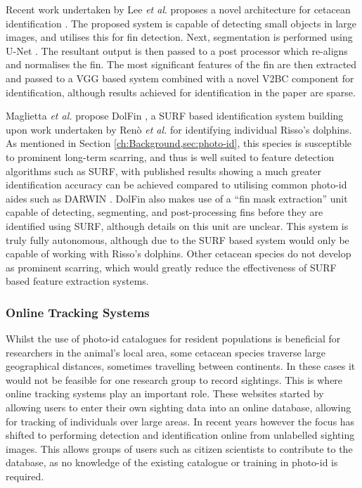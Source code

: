 Recent work undertaken by Lee \textit{et al}. proposes a novel architecture for cetacean identification \cite{lee_backbone_2020}. The proposed system is capable of detecting small objects in large images, and utilises this for fin detection. Next, segmentation is performed using U-Net \cite{ronneberger_u-net_2015}. The resultant output is then passed to a post processor which re-aligns and normalises the fin. The most significant features of the fin are then extracted and passed to a VGG based system \cite{simonyan_very_2015} combined with a novel V2BC component for identification, although results achieved for identification in the paper are sparse.

Maglietta \textit{et al.} propose DolFin \cite{maglietta_dolfin_2018}, a SURF based identification system \cite{bay_speeded-up_2008} building upon work undertaken by Renò \textit{et al.} \cite{reno_sift-based_2019} for identifying individual Risso's dolphins. As mentioned in Section \ref{ch:Background,sec:photo-id}, this species is susceptible to prominent long-term scarring, and thus is well suited to feature detection algorithms such as SURF, with published results showing a much greater identification accuracy can be achieved compared to utilising common photo-id aides such as DARWIN \cite{hale_unsupervised_2012}. DolFin also makes use of a ``fin mask extraction'' unit capable of detecting, segmenting, and post-processing fins before they are identified using SURF, although details on this unit are unclear. This system is truly fully autonomous, although due to the SURF based system would only be capable of working with Risso's dolphins. Other cetacean species do not develop as prominent scarring, which would greatly reduce the effectiveness of SURF based feature extraction systems. 

\subsubsection{Online Tracking Systems}\label{ch:Background,sec:conTech,sub:photoIDAides,subsub:OnlineTracking}

Whilst the use of photo-id catalogues for resident populations is beneficial for researchers in the animal's local area, some cetacean species traverse large geographical distances, sometimes travelling between continents. In these cases it would not be feasible for one research group to record sightings. This is where online tracking systems play an important role. These websites started by allowing users to enter their own sighting data into an online database, allowing for tracking of individuals over large areas. In recent years however the focus has shifted to performing detection and identification online from unlabelled sighting images. This allows groups of users such as citizen scientists to contribute to the database, as no knowledge of the existing catalogue or training in photo-id is required.

